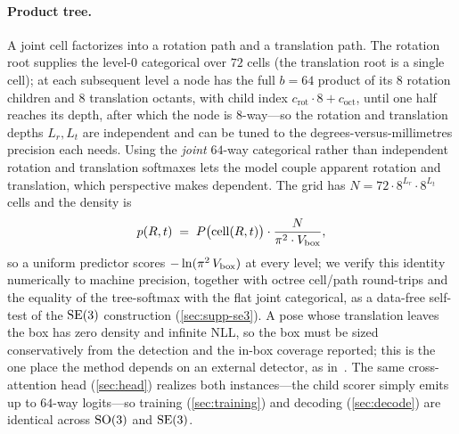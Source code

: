 \paragraph{Product tree.}
A joint cell factorizes into a rotation path and a translation path. The rotation
root supplies the level-$0$ categorical over $72$ cells (the translation root is a
single cell); at each subsequent level a node has the full $b{=}64$ product of its
$8$ rotation children and $8$ translation octants, with child index
$c_{\text{rot}}\!\cdot\!8+c_{\text{oct}}$, until one half reaches its depth, after
which the node is $8$-way---so the rotation and translation depths $L_r,L_t$ are
independent and can be tuned to the degrees-versus-millimetres precision each needs.
Using the \emph{joint} $64$-way categorical rather than independent rotation and
translation softmaxes lets the model couple apparent rotation and translation,
which perspective makes dependent. The grid has
$N=72\cdot 8^{L_r}\cdot 8^{L_t}$ cells and the density is
\begin{equation}
  p(R,t) \;=\; P\big(\mathrm{cell}(R,t)\big)\cdot
  \frac{N}{\pi^2\cdot V_{\text{box}}},
  \label{eq:se3density}
\end{equation}
so a uniform predictor scores $-\ln(\pi^2\,V_{\text{box}})$ at every level; we verify
this identity numerically to machine precision, together with octree
cell/path round-trips and the equality of the tree-softmax with the flat joint
categorical, as a data-free self-test of the $\mathrm{SE}(3)$ construction
(\cref{sec:supp-se3}). A pose whose translation leaves the box has zero density and
infinite NLL, so the box must be sized conservatively from the detection and the
in-box coverage reported; this is the one place the method depends on an external
detector, as in~\cite{haugaard2023spyropose}. The same cross-attention head
(\cref{sec:head}) realizes both instances---the child scorer simply emits up to
$64$-way logits---so training (\cref{sec:training}) and decoding (\cref{sec:decode})
are identical across $\mathrm{SO}(3)$ and $\mathrm{SE}(3)$.

